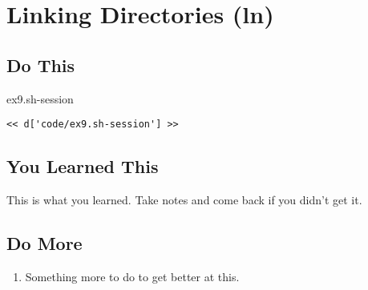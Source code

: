 \chapter{Linking Directories (ln)}

\section{Do This}

\begin{code}{ex9.sh-session}
\begin{Verbatim}
<< d['code/ex9.sh-session'] >>
\end{Verbatim}
\end{code}


\section{You Learned This}

This is what you learned.  Take notes and come back if you didn't get it.

\section{Do More}

\begin{enumerate}
\item Something more to do to get better at this.
\end{enumerate}

